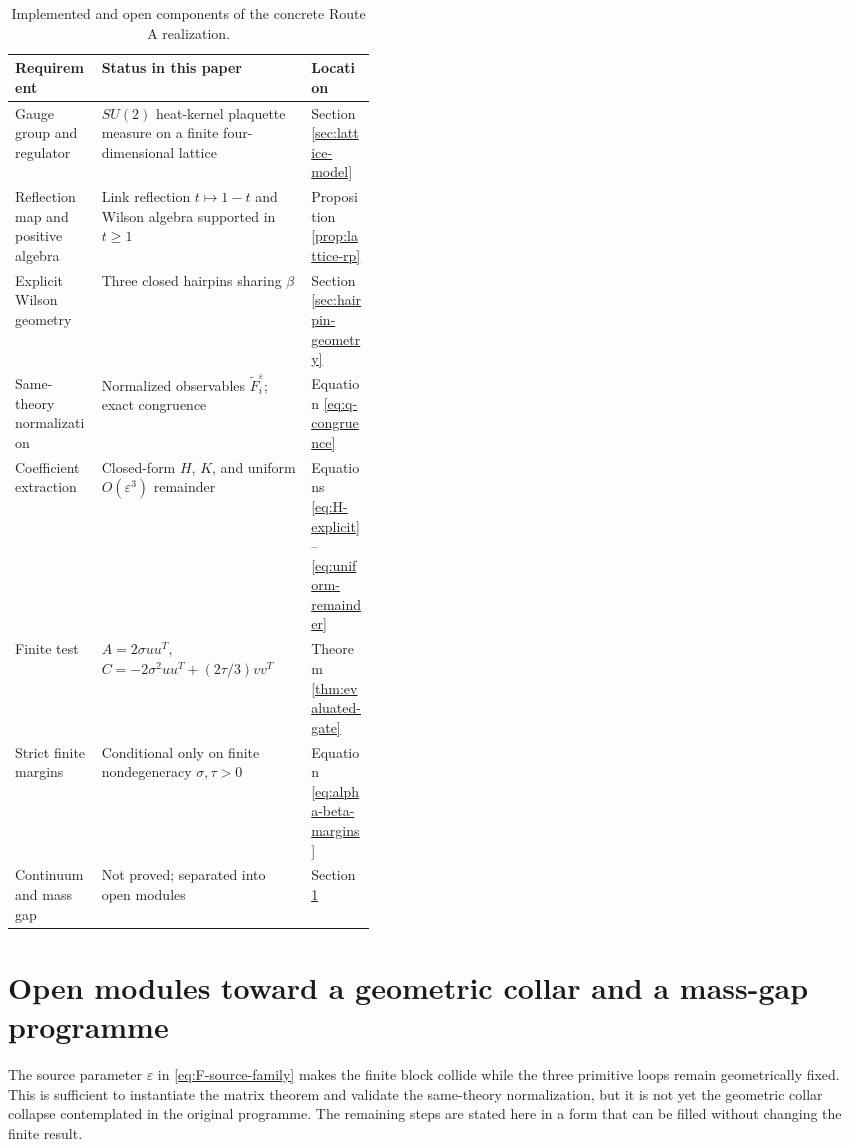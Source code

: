 \documentclass[11pt]{article}
\newcommand{\eps}{\varepsilon}
\begin{document}
\begin{table}[t]
\centering
\begin{tabularx}{\linewidth}{>{\raggedright\arraybackslash}p{0.24\linewidth}X>{\raggedright\arraybackslash}p{0.18\linewidth}}
\toprule
Requirement & Status in this paper & Location \\
\midrule
Gauge group and regulator & $SU(2)$ heat-kernel plaquette measure on a finite four-dimensional lattice & Section \ref{sec:lattice-model} \\
Reflection map and positive algebra & Link reflection $t\mapsto1-t$ and Wilson algebra supported in $t\ge1$ & Proposition \ref{prop:lattice-rp} \\
Explicit Wilson geometry & Three closed hairpins sharing $\beta$ & Section \ref{sec:hairpin-geometry} \\
Same-theory normalization & Normalized observables $\widetilde F_i^\eps$; exact congruence & Equation \eqref{eq:q-congruence} \\
Coefficient extraction & Closed-form $H$, $K$, and uniform $O(\eps^3)$ remainder & Equations \eqref{eq:H-explicit}--\eqref{eq:uniform-remainder} \\
Finite test & $A=2\sigma uu^T$, $C=-2\sigma^2uu^T+(2\tau/3)vv^T$ & Theorem \ref{thm:evaluated-gate} \\
Strict finite margins & Conditional only on finite nondegeneracy $\sigma,\tau>0$ & Equation \eqref{eq:alpha-beta-margins} \\
Continuum and mass gap & Not proved; separated into open modules & Section \ref{sec:open-modules} \\
\bottomrule
\end{tabularx}
\caption{Implemented and open components of the concrete Route A realization.}
\label{tab:route-a-status}
\end{table}

\section{Open modules toward a geometric collar and a mass-gap programme}
\label{sec:open-modules}

The source parameter $\eps$ in \eqref{eq:F-source-family} makes the finite block collide while the three primitive loops remain geometrically fixed.  This is sufficient to instantiate the matrix theorem and validate the same-theory normalization, but it is not yet the geometric collar collapse contemplated in the original programme.  The remaining steps are stated here in a form that can be filled without changing the finite result.
\end{document}
